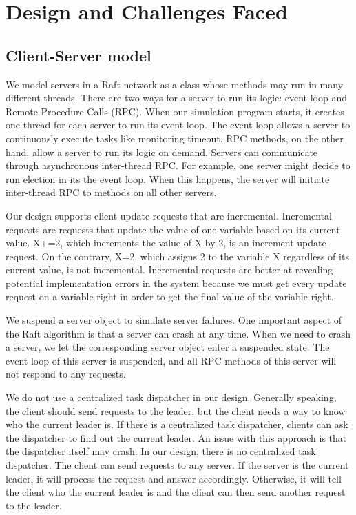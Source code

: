 \documentclass[letterpaper,twocolumn,10pt]{article}
\begin{document}
\section{Design and Challenges Faced}

\subsection{Client-Server model}
We model servers in a Raft network as a class whose methods may run in many different threads. There are two ways for a server to run its logic: event loop and Remote Procedure Calls (RPC). When our simulation program starts, it creates one thread for each server to run its event loop. The event loop allows a server to continuously execute tasks like monitoring timeout. RPC methods, on the other hand, allow a server to run its logic on demand. Servers can communicate through asynchronous inter-thread RPC. For example, one server might decide to run election in its the event loop. When this happens, the server will initiate inter-thread RPC to methods on all other servers. 

Our design supports client update requests that are incremental. Incremental requests are requests that update the value of one variable based on its current value. X+=2, which increments the value of X by 2, is an increment update request. On the contrary, X=2, which assigns 2 to the variable X regardless of its current value, is not incremental. Incremental requests are better at revealing potential implementation errors in the system because we must get every update request on a variable right in order to get the final value of the variable right. 

We suspend a server object to simulate server failures. One important aspect of the Raft algorithm is that a server can crash at any time. When we need to crash a server, we let the corresponding server object enter a suspended state. The event loop of this server is suspended, and all RPC methods of this server will not respond to any requests.

We do not use a centralized task dispatcher in our design. Generally speaking, the client should send requests to the leader, but the client needs a way to know who the current leader is. If there is a centralized task dispatcher, clients can ask the dispatcher to find out the current leader. An issue with this approach is that the dispatcher itself may crash. In our design, there is no centralized task dispatcher. The client can send requests to any server. If the server is the current leader, it will process the request and answer accordingly. Otherwise, it will tell the client who the current leader is and the client can then send another request to the leader. 
\end{document}

